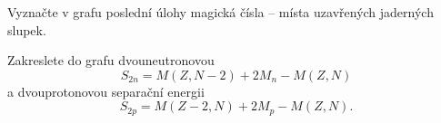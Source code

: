 \documentclass[a4paper,12pt,oneside]{article}
\theoremstyle{red}
\begin{document}
    \begin{task}
        Vyznačte v grafu poslední úlohy magická čísla -- místa uzavřených jaderných slupek.
    \end{task}

    \begin{task}
        Zakreslete do grafu dvouneutronovou 
        \begin{equation}
            S_{2n}=M(Z,N-2)+2M_{n}-M(Z,N)
        \end{equation}
        a dvouprotonovou separační energii
        \begin{equation}
            S_{2p}=M(Z-2,N)+2M_{p}-M(Z,N).
        \end{equation}
    \end{task}
\end{document}

